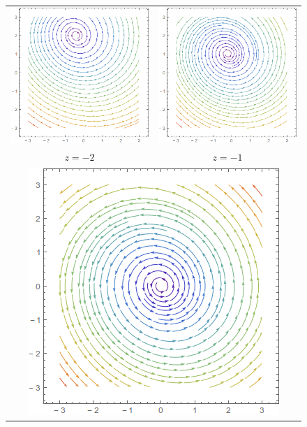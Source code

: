 \documentclass{article}
\begin{document}
\begin{figure}[h]
	\centering
	\begin{tabular}{c c}
		\includegraphics[scale=0.5]{spz-2} & \includegraphics[scale=0.5]{spz-1} \\
		$z=-2$                             & $z=-1$                             \\
		\multicolumn{2}{c}{\includegraphics[scale=0.5]{spz0}}\\

\end{tabular}
\end{figure}
\end{document}
